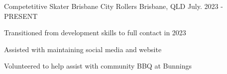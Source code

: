 

\begin{cventries}

  \cventry
    {Competetitive Skater} %
    {Brisbane City Rollers} %
    {Brisbane, QLD} %
    {July. 2023 - PRESENT} %
    {
      \begin{cvitems} %
        \item {Transitioned from development skills to full contact in 2023}
        \item {Assisted with maintaining social media and website}
        \item {Volunteered to help assist with community BBQ at Bunnings}
      \end{cvitems}
    }


\end{cventries}

